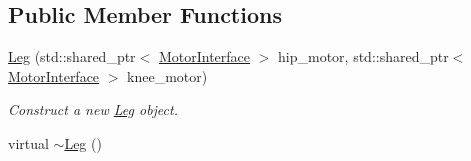 \subsection*{Public Member Functions}
\begin{DoxyCompactItemize}
\item 
\hyperlink{classblmc__drivers_1_1Leg_aaa53f0583fcfd7f4e8aa32889aaa2f85}{Leg} (std\+::shared\+\_\+ptr$<$ \hyperlink{classblmc__drivers_1_1MotorInterface}{Motor\+Interface} $>$ hip\+\_\+motor, std\+::shared\+\_\+ptr$<$ \hyperlink{classblmc__drivers_1_1MotorInterface}{Motor\+Interface} $>$ knee\+\_\+motor)
\begin{DoxyCompactList}\small\item\em Construct a new \hyperlink{classblmc__drivers_1_1Leg}{Leg} object. \end{DoxyCompactList}\item 
virtual \hyperlink{classblmc__drivers_1_1Leg_add76148d01d09ecb505bb23ce34d45c8}{$\sim$\+Leg} ()\hypertarget{classblmc__drivers_1_1Leg_add76148d01d09ecb505bb23ce34d45c8}{}\label{classblmc__drivers_1_1Leg_add76148d01d09ecb505bb23ce34d45c8}


\end{DoxyCompactItemize}
